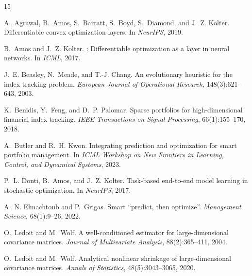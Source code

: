 \documentclass[11pt]{article}
\begin{document}

\begin{thebibliography}{15}

A.~Agrawal, B.~Amos, S.~Barratt, S.~Boyd, S.~Diamond, and J.~Z. Kolter.
\newblock Differentiable convex optimization layers.
\newblock In \emph{NeurIPS}, 2019.

B.~Amos and J.~Z. Kolter.
: Differentiable optimization as a layer in neural networks.
\newblock In \emph{ICML}, 2017.

J.~E. Beasley, N.~Meade, and T.-J. Chang.
\newblock An evolutionary heuristic for the index tracking problem.
\newblock \emph{European Journal of Operational Research}, 148(3):621--643, 2003.

K.~Benidis, Y.~Feng, and D.~P. Palomar.
\newblock Sparse portfolios for high-dimensional financial index tracking.
\newblock \emph{IEEE Transactions on Signal Processing}, 66(1):155--170, 2018.

A.~Butler and R.~H. Kwon.
\newblock Integrating prediction and optimization for smart portfolio management.
\newblock In \emph{ICML Workshop on New Frontiers in Learning, Control, and Dynamical Systems}, 2023.

P.~L. Donti, B.~Amos, and J.~Z. Kolter.
\newblock Task-based end-to-end model learning in stochastic optimization.
\newblock In \emph{NeurIPS}, 2017.

A.~N. Elmachtoub and P.~Grigas.
\newblock Smart ``predict, then optimize''.
\newblock \emph{Management Science}, 68(1):9--26, 2022.

O.~Ledoit and M.~Wolf.
\newblock A well-conditioned estimator for large-dimensional covariance matrices.
\newblock \emph{Journal of Multivariate Analysis}, 88(2):365--411, 2004.

O.~Ledoit and M.~Wolf.
\newblock Analytical nonlinear shrinkage of large-dimensional covariance matrices.
\newblock \emph{Annals of Statistics}, 48(5):3043--3065, 2020.


\end{thebibliography}
\end{document}

